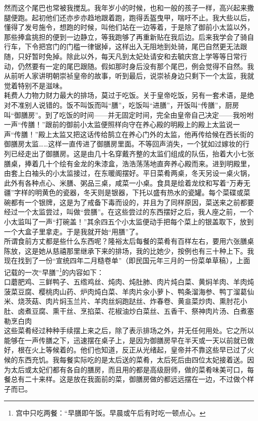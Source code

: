 然而这个尾巴也常被我搅乱。我年岁小的时候，也和一般的孩子一样，高兴起来撒腿便跑。起初他们还亦步亦趋地跟着跑，跑得丢盔曳甲，喘吁不止。我大些以后，懂得了发号施令，想跑的时候，叫他们站在一边等着，于是除了御前小太监以外，那些捧盒挑担的便到一边静立，等我跑够了再重新贴在我后边。后来我学会了骑自行车，下令把宫门的门槛一律锯掉，这样出入无阻地到处骑，尾巴自然更无法跟随，只好暂时免掉。除此以外，每天凡到太妃处请安和去毓庆宫上学等等日常行动，仍然要有一定的尾巴跟随。假如那时身后没有那个尾巴，例会觉得不自然。我从前听人家讲明朝崇祯皇帝的故事，听到最后，说崇祯身边只剩下一个太监，我就觉着特别不是滋味。\\

耗费人力物力财力最大的排场，莫过于吃饭。关于皇帝吃饭，另有一套术语，是绝对不准别人说错的。饭不叫饭而叫“膳”，吃饭叫“进膳”，开饭叫“传膳”，厨房叫“御膳房”。到了吃饭的时间——并无固定时间，完全由皇帝自己决定——我吩咐一声“传膳！”跟前的御前小太监便照样向守在养心殿的明殿上的殿上太监说一声“传膳！”殿上太监又把这话传给鹄立在养心门外的太监，他再传给候在西长街的御膳房太监……这样一直传进了御膳房里面。不等回声消失，一个犹如过嫁妆的行列已经走出了御膳房。这是由几十名穿戴齐整的太监们组成的队伍，抬着大小七张膳桌，捧着几十个绘有金龙的朱漆盒，浩浩荡荡地直奔养心殿而来。进到明殿里，由套上白袖头的小太监接过，在东暖阁摆好。平日菜肴两桌，冬天另设一桌火锅，此外有各种点心、米膳、粥品三桌，咸菜一小桌。食具是绘着龙纹和写着“万寿无疆”字样的明黄色的瓷器，冬天则是银器，下托以盛有热水的瓷罐。每个菜碟或菜碗都有一个银牌，这是为了戒备下毒而设的，并且为了同样原因，菜送来之前都要经过一个太监尝过，叫做“尝膳”。在这些尝过的东西摆好之后，我人座之前，一个小太监叫了一声“打碗盖！”其余四五个小太监便动手把每个菜上的银盖取下，放到一个大盒子里拿走。于是我就开始“用膳”了。\\

所谓食前方丈都是些什么东西呢？隆裕太后每餐的菜肴有百样左右，要用六张膳桌陈放，这是她从慈禧那里继承下来的排场，我的比她少，按例也有三十种上下。我现在找到了一份“宣统四年二月糙卷单”（即民国元年三月的一份菜单草稿），上面记载的一次“早膳”\footnote{宫中只吃两餐：“早膳即午饭。早晨或午后有时吃一顿点心。}的内容如下：\\

口蘑肥鸡、三鲜鸭子、五绺鸡丝、炖肉、炖肚肺、肉片炖白菜、黄焖羊肉、羊肉炖菠菜豆腐、樱桃肉山药、炉肉炖白菜、羊肉片汆小萝卜、鸭条溜海参、鸭丁溜葛仙米、烧茨菇、肉片焖玉兰片、羊肉丝焖跑跶丝、炸春卷、黄韭菜炒肉、熏肘花小肚、卤煮豆腐、熏干丝、烹掐菜、花椒油炒白菜丝、五香干、祭神肉片汤、白煮塞勒烹白肉\\

这些菜肴经过种种手续摆上来之后，除了表示排场之外，并无任何用处。它之所以能够在一声传膳之下，迅速摆在桌子上，是因为御膳房早在半天或一天以前就已做好，根在火上等候着的。他们也知道，反正从光绪起，皇帝并不靠这些早已过了火候的东西充饥。我每餐实际吃的是太后送的菜肴，太后死后由四位太妃接着送。因为太后或太妃们都有各自的膳房，而且用的都是高级厨师，做的菜肴味美可口，每餐总有二十来样。这是放在我面前的菜，御膳房做的都远远摆在一边，不过做个样子而已。\\

